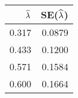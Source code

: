 \begin{table}[ht]
\centering
\begin{tabular}{rr}
  \hline
$\widehat{\lambda}$ & SE($\widehat{\lambda}$) \\ 
  \hline
0.317 & 0.0879 \\ 
  0.433 & 0.1200 \\ 
  0.571 & 0.1584 \\ 
  0.600 & 0.1664 \\ 
   \hline
\end{tabular}
\end{table}
